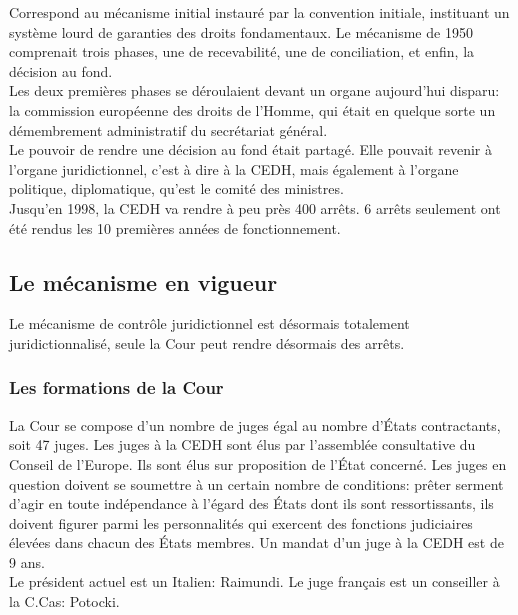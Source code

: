 \documentclass[10pt, a4paper, openany]{book}
\begin{document}
Correspond au mécanisme initial instauré par la convention initiale, instituant un système lourd de garanties des droits fondamentaux. Le mécanisme de 1950 comprenait trois phases, une de recevabilité, une de conciliation, et enfin, la décision au fond. \\
Les deux premières phases se déroulaient devant un organe aujourd'hui disparu: la commission européenne des droits de l'Homme, qui était en quelque sorte un démembrement administratif du secrétariat général. \\
Le pouvoir de rendre une décision au fond était partagé. Elle pouvait revenir à l'organe juridictionnel, c'est à dire à la CEDH, mais également à l'organe politique, diplomatique, qu'est le comité des ministres. \\
Jusqu'en 1998, la CEDH va rendre à peu près 400 arrêts. 6 arrêts seulement ont été rendus les 10 premières années de fonctionnement. 

\subsection{Le mécanisme en vigueur}

Le mécanisme de contrôle juridictionnel est désormais totalement juridictionnalisé, seule la Cour peut rendre désormais des arrêts. 

\subsubsection{Les formations de la Cour}

La Cour se compose d'un nombre de juges égal au nombre d'États contractants, soit 47 juges. Les juges à la CEDH sont élus par l'assemblée consultative du Conseil de l'Europe. Ils sont élus sur proposition de l'État concerné. Les juges en question doivent se soumettre à un certain nombre de conditions: prêter serment d'agir en toute indépendance à l'égard des États dont ils sont ressortissants, ils doivent figurer parmi les personnalités qui exercent des fonctions judiciaires élevées dans chacun des États membres. Un mandat d'un juge à la CEDH est de 9 ans. \\
Le président actuel est un Italien: Raimundi. Le juge français est un conseiller à la C.Cas: Potocki. 
\end{document}
